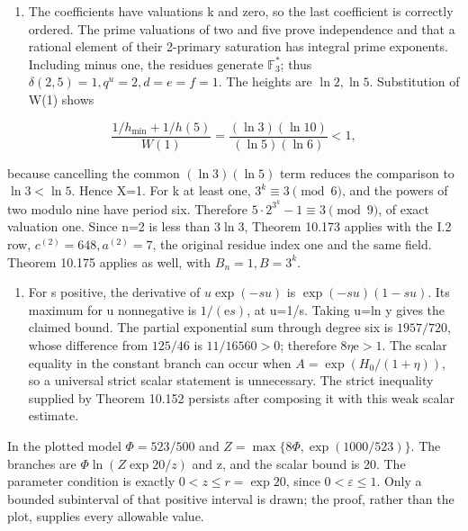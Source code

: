 \documentclass[
  11pt,
  a4paper,
]{article}
\providecommand{\tightlist}{%
  \setlength{\itemsep}{0pt}\setlength{\parskip}{0pt}}
\begin{document}
\begin{enumerate}
\def\labelenumi{(\alph{enumi})}
\setcounter{enumi}{1}
\tightlist
\item
  The coefficients have valuations k and zero, so the last coefficient
  is correctly ordered. The prime valuations of two and five prove
  independence and that a rational element of their 2-primary saturation
  has integral prime exponents. Including minus one, the residues
  generate \(\mathbb F_3^*\); thus \(\delta(2,5)=1,q^u=2,d=e=f=1\). The
  heights are \(\ln2,\ln5\). Substitution of W(1) shows
\end{enumerate}

\[
\frac{1/h_{\min}+1/h(5)}{W(1)}
=\frac{(\ln3)(\ln10)}{(\ln5)(\ln6)}<1,
\tag{10.658}
\]

because cancelling the common \((\ln3)(\ln5)\) term reduces the
comparison to \(\ln3<\ln5\). Hence X=1. For k at least one,
\(3^k\equiv3\pmod6\), and the powers of two modulo nine have period six.
Therefore \(5\cdot2^{3^k}-1\equiv3\pmod9\), of exact valuation one.
Since n=2 is less than \(3\ln3\), Theorem 10.173 applies with the I.2
row, \(c^{(2)}=648,a^{(2)}=7\), the original residue index one and the
same field. Theorem 10.175 applies as well, with \(B_n=1,B=3^k\).

\begin{enumerate}
\def\labelenumi{(\alph{enumi})}
\setcounter{enumi}{2}
\tightlist
\item
  For s positive, the derivative of \(u\exp(-su)\) is
  \(\exp(-su)(1-su)\). Its maximum for u nonnegative is
  \(1/(\mathrm e s)\), at u=1/s. Taking u=ln y gives the claimed bound.
  The partial exponential sum through degree six is \(1957/720\), whose
  difference from \(125/46\) is \(11/16560>0\); therefore
  \(8\eta\mathrm e>1\). The scalar equality in the constant branch can
  occur when \(A=\exp(H_0/(1+\eta))\), so a universal strict scalar
  statement is unnecessary. The strict inequality supplied by Theorem
  10.152 persists after composing it with this weak scalar estimate.
\end{enumerate}

In the plotted model \(\Phi=523/500\) and
\(Z=\max\{8\Phi,\exp(1000/523)\}\). The branches are
\(\Phi\ln(Z\exp20/z)\) and z, and the scalar bound is 20. The parameter
condition is exactly \(0<z\le r=\exp20\), since \(0<\varepsilon\le1\).
Only a bounded subinterval of that positive interval is drawn; the
proof, rather than the plot, supplies every allowable value.
\end{document}

